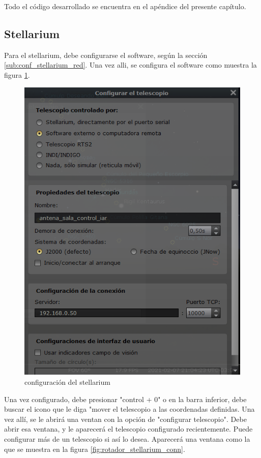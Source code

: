 Todo el código desarrollado se encuentra en el apéndice del presente capítulo. 




\subsection{Stellarium}

Para el stellarium, debe configurarse el software, según la sección \ref{sub:conf_stellarium_red}. Una vez alli, se configura el software como muestra la figura \ref{fig:conf_net_stell}. 

\begin{figure}[ht]
	\centering 
	\includegraphics[scale=0.5]{configuracion_telescopio}
	\caption{configuración del stellarium} 
	\label{fig:conf_net_stell}
\end{figure}  

Una vez configurado, debe presionar "control + 0" o en la barra inferior, debe buscar el icono que le diga "mover el telescopio a las coordenadas definidas. Una vez allí, se le abrirá una ventan con la opción de "configurar telescopio". Debe abrir esa ventana, y le aparecerá el telescopio configurado recientemente. Puede configurar más de un telescopio si así lo desea. Aparecerá una ventana como la que se muestra en la figura \ref{fig:rotador_stellarium_conn}. 
 

